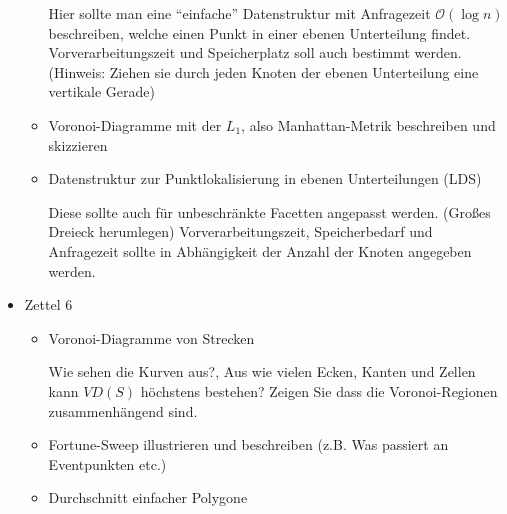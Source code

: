 \documentclass[a4paper]{article}
\begin{document}
\begin{itemize}
\begin{itemize}
		Hier sollte man eine "`einfache"' Datenstruktur mit Anfragezeit $\mathcal{O}(\log n)$ 
		beschreiben, welche einen Punkt in einer ebenen Unterteilung findet. Vorverarbeitungszeit und 
		Speicherplatz soll auch bestimmt werden. (Hinweis: Ziehen sie durch jeden Knoten der ebenen
		Unterteilung eine vertikale Gerade)
		
		\item Voronoi-Diagramme mit der $L_1$, also Manhattan-Metrik beschreiben und skizzieren
		\item Datenstruktur zur Punktlokalisierung in ebenen Unterteilungen (LDS)
		
		Diese sollte auch für unbeschränkte Facetten angepasst werden. (Großes Dreieck herumlegen)
		Vorverarbeitungszeit, Speicherbedarf und Anfragezeit sollte in Abhängigkeit der Anzahl
		der Knoten angegeben werden.
	\end{itemize}
	\item Zettel 6
	\begin{itemize}
		\item Voronoi-Diagramme von Strecken
		
		Wie sehen die Kurven aus?, Aus wie vielen Ecken, Kanten und Zellen kann $VD(S)$ höchstens
		bestehen? Zeigen Sie dass die Voronoi-Regionen zusammenhängend sind.
		
		\item Fortune-Sweep illustrieren und beschreiben (z.B. Was passiert an Eventpunkten etc.)
		
		\item Durchschnitt einfacher Polygone
		

\end{itemize}
\end{itemize}
\end{document}

